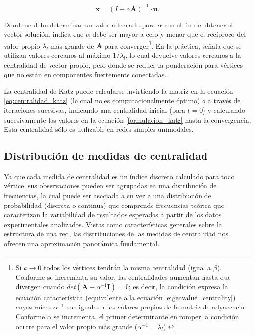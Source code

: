 \documentclass[letterpaper, 11pt]{book}
\theoremstyle{definition}
\theoremstyle{remark}
\begin{document}
\begin{equation}\label{eq:centralidad_katz}
    \mathbf{x} = 
    (I-\alpha \mathbf{A})^{-1} \cdot \mathbf{u}.
\end{equation} 


Donde se debe determinar un valor adecuado para $\alpha$ con el fin de obtener el vector solución. \citet{2010_Newman_Networks} indica que $\alpha$ debe ser mayor a cero y menor que el recíproco del valor propio $\lambda_l$ más grande de $\mathbf{A}$ para converger\footnote{
    Si $a \rightarrow 0$ todos los vértices tendrán la misma centralidad (igual a $\beta$). 
    Conforme se incrementa su valor, las centralidades aumentan hasta que divergen cuando $det(\mathbf{A}-\alpha^{-1}\mathbf{I})=0$; es decir, la condición expresa la ecuación característica (equivalente a la ecuación \ref{eigenvalue_centrality}) cuyas raíces $\alpha^{-1}$ son iguales a los valores propios de la matriz de adyacencia. 
    Conforme $\alpha$ se incrementa, el primer determinante en romper la condición ocurre para el valor propio más grande ($\alpha^{-1}= \lambda_{l}$). 
}. 
En la práctica, señala que se utilizan valores cercanos al máximo $1 / \lambda_{l}$, lo cual devuelve valores cercanos a la centralidad de vector propio, pero donde se reduce la ponderación para vértices que no están en componentes fuertemente conectadas.

La centralidad de Katz puede calcularse invirtiendo la matriz en la ecuación \ref{eq:centralidad_katz} (lo cual no es computacionalmente óptimo) o a través de iteraciones sucesivas, indicando una centralidad inicial (para $t=0$) y calculando sucesivamente los valores en la ecuación \ref{formulacion_katz} hasta la convergencia. 
Esta centralidad sólo es utilizable en redes simples unimodales. 



\subsection{Distribución de medidas de centralidad}
\label{sec:DistribucionCentralidades}

Ya que cada medida de centralidad es un índice discreto calculado para todo vértice, sus observaciones pueden ser agrupadas en una distribución de frecuencias, la cual puede ser asociada a su vez a una distribución de probabilidad (discreta o continua) que comprende frecuencias teórica que caracterizan la variabilidad de resultados esperados a partir de los datos experimentales analizados. 
Vistas como características generales sobre la estructura de una red, las distribuciones de las medidas de centralidad nos ofrecen una aproximación panorámica fundamental. 
\end{document}
